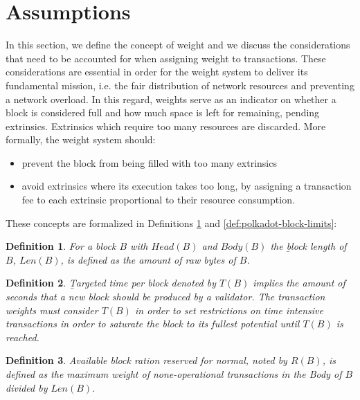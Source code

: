 \documentclass[11pt,a4paper]{article}
\newtheorem{definition}{Definition}
\begin{document}
\section{Assumptions}\label{sec:assumptions}

In this section, we define the concept of weight and we discuss the
considerations that need to be accounted for when assigning weight to
transactions. These considerations are essential in order for the weight system
to deliver its fundamental mission, i.e. the fair distribution of network
resources and preventing a network overload. In this regard, weights serve as an
indicator on whether a block is considered full and how much space is left for
remaining, pending extrinsics. Extrinsics which require too many resources are
discarded. More formally, the weight system should:

\begin{itemize}
\item prevent the block from being filled with too many extrinsics
\item avoid extrinsics where its execution takes too long, by assigning a
transaction fee to each extrinsic proportional to their resource consumption.
\end{itemize}

These concepts are formalized in Definitions \ref{def:block-length} and
\ref{def:polkadot-block-limits}:

\begin{definition}
  \label{def:block-length}
  For a block $B$ with $Head(B)$ and $Body(B)$ the {\b block length of $B$},
  $Len(B)$, is defined as the amount of raw bytes of $B$.
\end{definition}

\begin{definition}
  \label{def:target-time-per-block}
  {\b Targeted time per block} denoted by $T(B)$ implies the amount of seconds
  that a new block should be produced by a validator. The transaction weights
  must consider $T(B)$ in order to set restrictions on time intensive
  transactions in order to saturate the block to its fullest potential until
  $T(B)$ is reached.
\end{definition}

\begin{definition}
  \label{def:block-target-time}
  Available block ration reserved for normal, noted by $R(B)$, is defined as the
  maximum weight of none-operational transactions in the Body of $B$ divided by
  $Len(B)$.
\end{definition}
\end{document}
